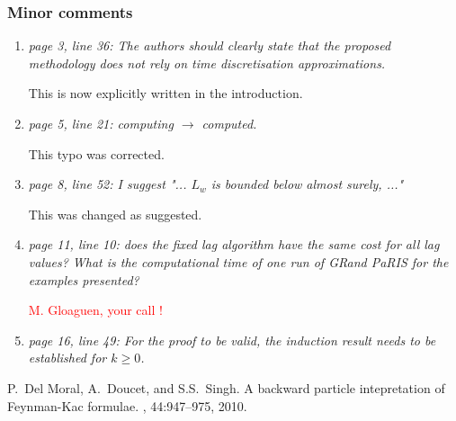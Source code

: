 \documentclass[12pt]{article}
\newcommand{\1}{\mathrm{1}}
\begin{document}
\subsubsection*{Minor comments}
\begin{enumerate}
\item{\em page 3, line 36: The authors should clearly state that the proposed methodology
does not rely on time discretisation approximations.}

\vspace{.3cm}

This is now explicitly written in the introduction.

\item{\em page 5, line 21: computing $\longrightarrow$ computed.}

\vspace{.3cm}

This typo was corrected.

\item {\em page 8, line 52: I suggest "... $L_w$ is bounded below almost surely, ..."}

\vspace{.3cm}

This was changed as suggested.

\item {\em page 11, line 10: does the fixed lag algorithm have the same cost for all lag values?
What is the computational time of one run of GRand PaRIS for the examples presented?}

\vspace{.3cm}

\textcolor{red}{M. Gloaguen, your call !}

\item {\em page 16, line 49: For the proof to be valid, the induction result needs to be established for $k\ge 0$.}

\vspace{.3cm}

\end{enumerate}


\begin{thebibliography}{10}

P.~{D}el {M}oral, {A}.~{D}oucet, and {S}.{S}.~{S}ingh.
\newblock A backward particle intepretation of {F}eynman-{K}ac formulae.
, 44:947--975, 2010.
\end{thebibliography}
\end{document}
